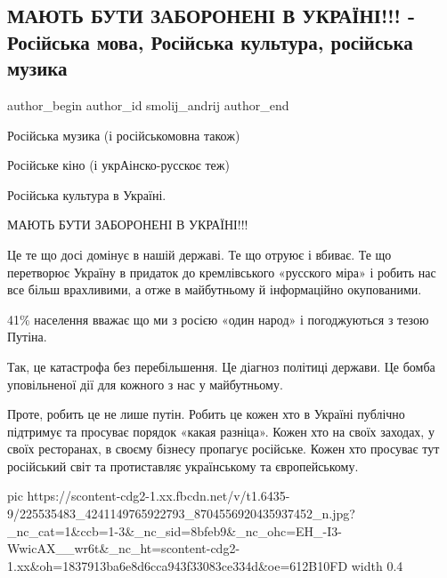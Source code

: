  
 
 
 
 
 
\subsection{МАЮТЬ БУТИ ЗАБОРОНЕНІ В УКРАЇНІ!!! - Російська мова, Російська культура, російська музика}
\label{sec:30_07_2021.fb.smolij_andrij.1.zapret_ukraina_jazyk_kultura}
 
\ifcmt
 author_begin
   author_id smolij_andrij
 author_end
\fi

Російська музика (і російськомовна також)

Російське кіно (і укрАінско-русскоє теж)

Російська культура в Україні. 

МАЮТЬ БУТИ ЗАБОРОНЕНІ В УКРАЇНІ!!!

Це те що досі домінує в нашій державі. Те що отруює і вбиває. Те що перетворює
Україну в придаток до кремлівського «русского міра» і робить нас все більш
врахливими, а отже в майбутньому й інформаційно окупованими.

41\% населення вважає що ми з росією «один народ» і погоджуються з тезою Путіна.

Так, це катастрофа без перебільшення. Це діагноз політиці держави. Це бомба
уповільненої дії для кожного з нас у майбутньому.

Проте, робить це не лише путін. Робить це кожен хто в Україні публічно
підтримує та просуває порядок «какая разніца». Кожен хто на своїх заходах, у
своїх ресторанах, в своєму бізнесу пропагує російське. Кожен хто просуває тут
російський світ та протиставляє українському та європейському. 

\ifcmt
  pic https://scontent-cdg2-1.xx.fbcdn.net/v/t1.6435-9/225535483_4241149765922793_8704556920435937452_n.jpg?_nc_cat=1&ccb=1-3&_nc_sid=8bfeb9&_nc_ohc=EH_-I3-WwicAX__wr6t&_nc_ht=scontent-cdg2-1.xx&oh=1837913ba6e8d6cca943f33083ce334d&oe=612B10FD
  width 0.4
\fi

